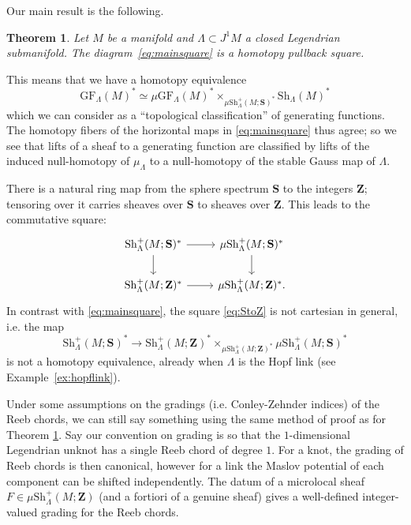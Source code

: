 \documentclass[12pt,a4paper]{article}
\numberwithin{equation}{section}
\newtheorem{thmintro}{Theorem}
\theoremstyle{definition}
\theoremstyle{remark}
\newcommand{\Z}{\mathbf{Z}}
\newcommand{\Sh}{\mathrm{Sh}}
\renewcommand{\S}{\mathbf{S}}
\newcommand{\GF}{\mathrm{GF}}
\begin{document}
Our main result is the following.
\begin{thmintro} \label{thm:main}
 Let $M$ be a manifold and $\Lambda\subset J^1 M$ a closed Legendrian submanifold.
The diagram~\eqref{eq:mainsquare} is a homotopy pullback square.
\end{thmintro}

This means that we have a homotopy equivalence
\begin{equation}\label{eq:mainfiberedproduct}
\GF_\Lambda(M)^* \simeq \mu \GF_\Lambda(M)^* \times_{\mu \Sh^+_\Lambda(M;\S)^*} \Sh_\Lambda(M)^*
\end{equation}
which we can consider as a ``topological classification'' of generating functions.
The homotopy fibers of the horizontal maps in \eqref{eq:mainsquare} thus agree; so we see that lifts of a sheaf to a generating function
are classified by lifts of the induced null-homotopy of $\mu_\Lambda$ to a null-homotopy of the stable Gauss map of $\Lambda$.

There is a natural ring map from the sphere spectrum $\S$ to the integers $\Z$; tensoring over it carries sheaves over $\S$ to sheaves over $\Z$.
This leads to the  commutative square:
\begin{equation}\label{eq:StoZ}
\begin{tikzcd}
\Sh^+_\Lambda(M;\S)^* \arrow[r]\arrow[d]& \mu\Sh^+_{\Lambda}(M;\S)^*\arrow[d] \\
\Sh^+_\Lambda(M;\Z)^* \arrow[r] &  \mu\Sh^+_\Lambda(M;\Z)^*.
\end{tikzcd}
\end{equation}
In contrast with \eqref{eq:mainsquare}, the square \eqref{eq:StoZ} is not cartesian in general, i.e.
the map
\begin{equation}\label{eq:mainfiberedZtoS}
\Sh_\Lambda^+(M;\S)^* \to  \Sh_\Lambda^+(M;\Z)^* \times_{\mu \Sh^+_\Lambda(M;\Z)^*} \mu\Sh^+_\Lambda(M;\S)^*
\end{equation}
is not a homotopy equivalence, already when $\Lambda$ is the Hopf link (see Example~\ref{ex:hopflink}).


Under some assumptions on the gradings (i.e. Conley-Zehnder indices) of the Reeb chords, we can still say something
using the same method of proof as for Theorem \ref{thm:main}.
Say our convention on grading is so that the $1$-dimensional Legendrian unknot has a single Reeb chord of degree $1$.
For a knot, the grading of Reeb chords is then canonical, however for a link the Maslov potential
of each component can be shifted independently. The datum of a microlocal sheaf $F\in \mu \Sh^+_\Lambda(M;\Z)$
(and a fortiori of a genuine sheaf) gives a well-defined integer-valued grading for the Reeb chords.
\end{document}
